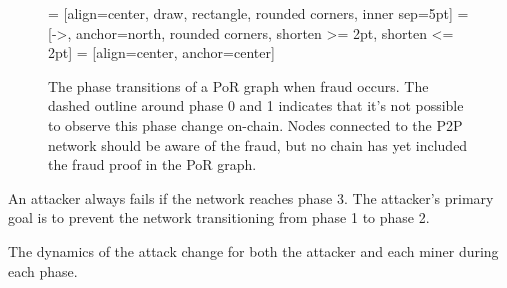 \begin{figure}[h]
    \begin{center}
         = [align=center, draw, rectangle, rounded corners, inner sep=5pt]
         = [->, anchor=north, rounded corners, shorten >= 2pt, shorten <= 2pt]
         = [align=center, anchor=center]
    \end{center}
    \caption[
        Phase transitions of a PoR graph when fraud occurs.
    ]{
        The phase transitions of a PoR graph when fraud occurs.
        The dashed outline around phase 0 and 1 indicates that it's not possible to observe this phase change on-chain.
        Nodes connected to the P2P network should be aware of the fraud, but no chain has yet included the fraud proof in the PoR graph.
    }
    \label{fig:por-graph-phases}
\end{figure}

An attacker always fails if the network reaches phase 3.
The attacker's primary goal is to prevent the network transitioning from phase 1 to phase 2.

The dynamics of the attack change for both the attacker and each miner during each phase.


